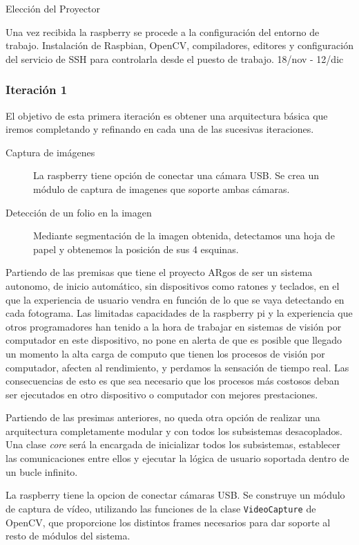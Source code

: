 Elección del Proyector

Una vez recibida la raspberry se procede a la configuración del entorno de trabajo. Instalación de Raspbian, OpenCV, compiladores, editores y configuración del servicio de SSH para controlarla desde el puesto de trabajo.
18/nov - 12/dic

\subsubsection{Iteración 1}
El objetivo de esta primera iteración es obtener una arquitectura básica que iremos completando y refinando en cada una de las sucesivas iteraciones.

\begin{description}
\item [Captura de imágenes] La raspberry tiene opción de conectar una cámara USB. Se crea un módulo de captura de imagenes que soporte ambas cámaras.
\item [Detección de un folio en la imagen] Mediante segmentación de la imagen obtenida, detectamos una hoja de papel y obtenemos la posición de sus 4 esquinas.
\end{description}

Partiendo de las premisas que tiene el proyecto ARgos de ser un sistema autonomo, de inicio automático, sin dispositivos como ratones y teclados, en el que la experiencia de usuario vendra en función de lo que se vaya detectando en cada fotograma. Las limitadas capacidades de la raspberry pi y la experiencia que otros programadores han tenido a la hora de trabajar en sistemas de visión por computador en este dispositivo, no pone en alerta de que es posible que llegado un momento la alta carga de computo que tienen los procesos de visión por computador, afecten al rendimiento, y perdamos la sensación de tiempo real. Las consecuencias de esto es que sea necesario que los procesos más costosos deban ser ejecutados en otro dispositivo o computador con mejores prestaciones.  

Partiendo de las presimas anteriores, no queda otra opción de realizar una arquitectura completamente modular y con todos los subsistemas desacoplados. Una clase \emph{core} será la encargada de inicializar todos los subsistemas, establecer las comunicaciones entre ellos y ejecutar la lógica de usuario soportada dentro de un bucle infinito.

La raspberry tiene la opcion de conectar cámaras USB. Se construye un módulo de captura de vídeo, utilizando las funciones de la clase \texttt{VideoCapture} de OpenCV, que proporcione los distintos frames necesarios para dar soporte al resto de módulos del sistema. 

